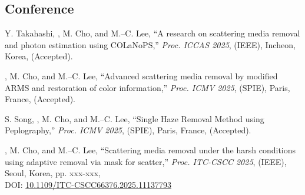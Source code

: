\documentclass[a4paper,9pt]{extarticle}
\begin{document}
\subsection*{Conference}
\begin{enumerate}[label={[\arabic*]}, start=1]
    
    \item 
    Y. Takahashi, , M. Cho, and M.--C. Lee, 
    ``A research on scattering media removal and photon estimation using COLaNoPS,''
    \textit{Proc. ICCAS 2025}, (IEEE),
    Incheon, Korea,
    (Accepted).

    \item 
    , M. Cho, and M.--C. Lee, 
    ``Advanced scattering media removal by modified ARMS and restoration of color information,'' 
    \textit{Proc. ICMV 2025}, (SPIE),
    Paris, France,
    (Accepted).
        
    \item 
    S. Song, , M. Cho, and M.--C. Lee, 
    ``Single Haze Removal Method using Peplography,'' 
    \textit{Proc. ICMV 2025}, (SPIE),
    Paris, France,
    (Accepted).

    \item 
    , M. Cho, and M.--C. Lee, 
    ``Scattering media removal under the harsh conditions using adaptive removal via mask for scatter,'' 
    \textit{Proc. ITC-CSCC 2025}, (IEEE),
    Seoul, Korea, 
    pp. xxx-xxx, \\
    DOI: \href{https://doi.org/10.1109/ITC-CSCC66376.2025.11137793}{10.1109/ITC-CSCC66376.2025.11137793}
    

\end{enumerate}
\end{document}
